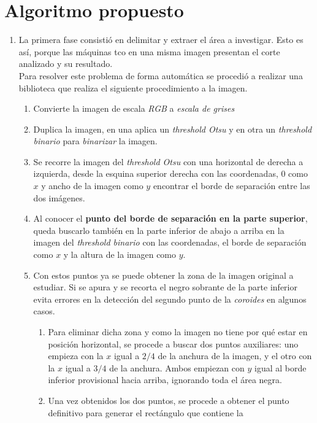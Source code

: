 \section{Algoritmo propuesto}
\begin{enumerate}
\item La primera fase consistió en delimitar y extraer el área a
  investigar. Esto es así, porque las máquinas \gls{tco} en una misma
  imagen presentan el corte analizado y su resultado.\\
  Para resolver este problema de forma automática se procedió a
  realizar una biblioteca que realiza el siguiente procedimiento a la
  imagen.
  \begin{enumerate}[label*=\arabic*.]
  \item Convierte la imagen de escala \emph{RGB} a \emph{escala de
      grises}
  \item Duplica la imagen, en una aplica un \emph{threshold Otsu} y en
    otra un \emph{threshold binario} para \emph{binarizar} la imagen.
  \item Se recorre la imagen del \emph{threshold Otsu} con una
    horizontal de derecha a izquierda, desde la esquina superior
    derecha con las coordenadas, 0 como $x$ y ancho de la imagen como
    $y$ encontrar el borde de separación entre las dos imágenes.
  \item Al conocer el \textbf{punto del borde de separación en la
      parte superior}, queda buscarlo también en la parte inferior de
    abajo a arriba en la imagen del \emph{threshold binario} con las
    coordenadas, el borde de separación como $x$ y la altura de la
    imagen como $y$.
  \item Con estos puntos ya se puede obtener la zona de la imagen
    original a estudiar. Si se apura y se recorta el negro sobrante de
    la parte inferior evita errores en la detección del segundo punto
    de la \emph{coroides} en algunos casos.
    \begin{enumerate}[label*=\arabic*.]
    \item Para eliminar dicha zona y como la imagen no tiene por qué
      estar en posición horizontal, se procede a buscar dos puntos
      auxiliares: uno empieza con la $x$ igual a $2/4$ de la anchura
      de la imagen, y el otro con la $x$ igual a $3/4$ de la
      anchura. Ambos empiezan con $y$ igual al borde inferior
      provisional hacia arriba, ignorando toda el área negra.
    \item Una vez obtenidos los dos puntos, se procede a obtener el
      punto definitivo para generar el rectángulo que contiene la

\end{enumerate}
\end{enumerate}
\end{enumerate}
